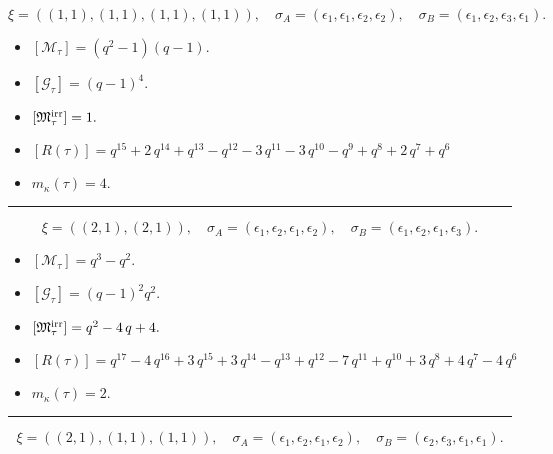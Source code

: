 \documentclass[10pt,a4paper]{amsart}
\begin{document}
$$\xi = ({(1, 1), (1, 1)}, {(1, 1), (1, 1)}),\quad \sigma_A = ({{\epsilon_1}, {\epsilon_1}}, {{\epsilon_2}, {\epsilon_2}}),\quad \sigma_B = ({{\epsilon_1}, {\epsilon_2}}, {{\epsilon_3}, {\epsilon_1}}).$$

\begin{itemize}
 \item $[\mathcal{M}_{\tau}] = {\left(q^{2} - 1\right)} {\left(q - 1\right)} .$

 \item $[\mathcal{G}_{\tau}] = {\left(q - 1\right)}^{4} .$

 \item $[{\frak M}_{\tau}^{\textrm{irr}}] = 1 .$

 \item $[R(\tau)] = q^{15} + 2 \, q^{14} + q^{13} - q^{12} - 3 \, q^{11} - 3 \, q^{10} - q^{9} + q^{8} + 2 \, q^{7} + q^{6} $

 \item $m_{\kappa}(\tau) = 4 .$

 \end{itemize}
\noindent\rule{8cm}{0.4pt}

$$\xi = ({(2, 1)}, {(2, 1)}),\quad \sigma_A = ({{\epsilon_1, \epsilon_2}}, {{\epsilon_1, \epsilon_2}}),\quad \sigma_B = ({{\epsilon_1, \epsilon_2}}, {{\epsilon_1, \epsilon_3}}).$$

\begin{itemize}
 \item $[\mathcal{M}_{\tau}] = q^{3} - q^{2} .$

 \item $[\mathcal{G}_{\tau}] = {\left(q - 1\right)}^{2} q^{2} .$

 \item $[{\frak M}_{\tau}^{\textrm{irr}}] = q^{2} - 4 \, q + 4 .$

 \item $[R(\tau)] = q^{17} - 4 \, q^{16} + 3 \, q^{15} + 3 \, q^{14} - q^{13} + q^{12} - 7 \, q^{11} + q^{10} + 3 \, q^{8} + 4 \, q^{7} - 4 \, q^{6} $

 \item $m_{\kappa}(\tau) = 2 .$

 \end{itemize}
\noindent\rule{8cm}{0.4pt}

$$\xi = ({(2, 1)}, {(1, 1), (1, 1)}),\quad \sigma_A = ({{\epsilon_1, \epsilon_2}}, {{\epsilon_1}, {\epsilon_2}}),\quad \sigma_B = ({{\epsilon_2, \epsilon_3}}, {{\epsilon_1}, {\epsilon_1}}).$$
\end{document}
